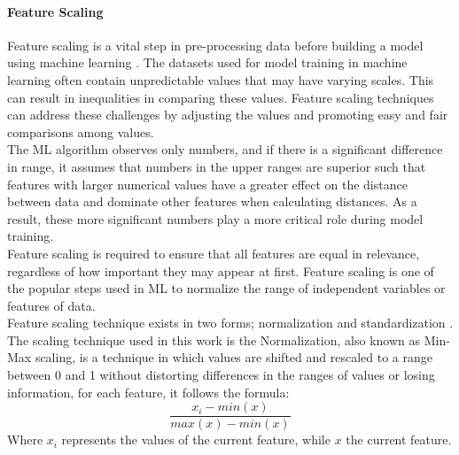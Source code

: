 \documentclass[runningheads]{llncs}
\begin{document}
\paragraph{Feature Scaling}
Feature scaling is a vital step in pre-processing data before building a model using machine learning  \cite{ref_paper6}. The datasets used for model training in machine learning often contain unpredictable values that may have varying scales. This can result in inequalities in comparing these values. Feature scaling techniques can address these challenges by adjusting the values and promoting easy and fair comparisons among values.\\
The ML algorithm observes only numbers, and if there is a significant difference in range, it assumes that numbers in the upper ranges are superior such that features with larger numerical values have a greater effect on the distance between data and dominate other features when calculating distances. As a result, these more significant numbers play a more critical role during model training.\\
Feature scaling is required to ensure that all features are equal in relevance, regardless of how important they may appear at first. Feature scaling is one of the popular steps used in ML to normalize the range of independent variables or features of data.\\
Feature scaling technique exists in two forms; normalization and standardization \cite{ref_paper7}. The scaling technique used in this work is the Normalization, also known as Min-Max scaling, is a technique in which values are shifted and rescaled to a range between 0 and 1 without distorting differences in the ranges of values or losing information, for each feature, it follows the formula:
\begin{equation}
\frac{x_i - min(x)}{max(x) - min(x)}
\end{equation}
Where $x_{i}$ represents the values of the current feature, while $x$ the current feature.
\\
\end{document}
